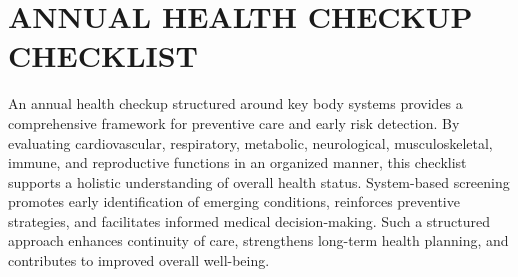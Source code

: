 
\section*{\centering ANNUAL HEALTH CHECKUP CHECKLIST}
\vspace*{0.5cm}

An annual health checkup structured around key body systems provides a comprehensive framework for preventive care and early risk detection. By evaluating cardiovascular, respiratory, metabolic, neurological, musculoskeletal, immune, and reproductive functions in an organized manner, this checklist supports a holistic understanding of overall health status. System-based screening promotes early identification of emerging conditions, reinforces preventive strategies, and facilitates informed medical decision-making. Such a structured approach enhances continuity of care, strengthens long-term health planning, and contributes to improved overall well-being.

